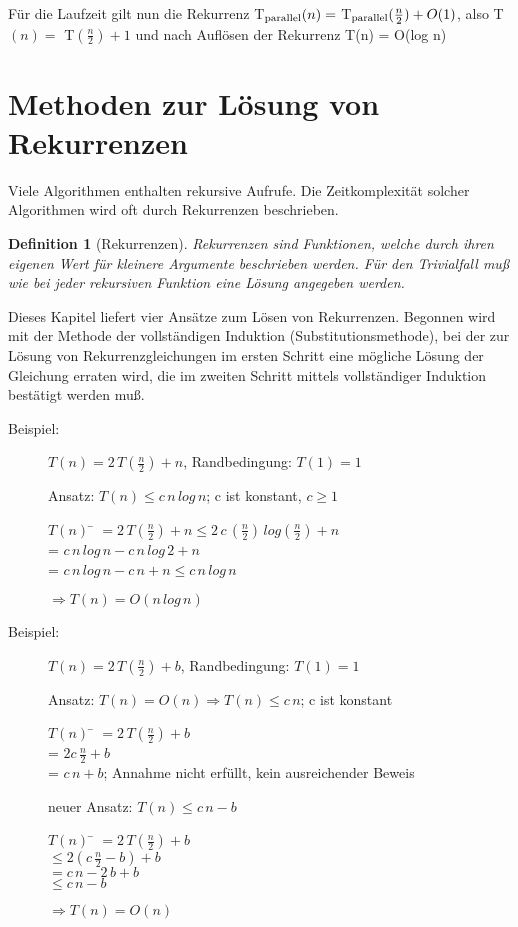 \documentclass[ngerman]{scrreprt}%
\theoremstyle{break}
\newtheorem{definition}{Definition}
\begin{document}
$$  $$

Für die Laufzeit gilt nun die Rekurrenz T$_{\textup{parallel}}(n) =$ T$_{\textup{parallel}}(\frac{n}{2}) + O(1)$,
also T$(n)=$ T$(\frac{n}{2})+1$ und nach Auflösen der Rekurrenz T(n) = O(log n)

\section{Methoden zur Lösung von Rekurrenzen}
Viele Algorithmen enthalten rekursive Aufrufe. Die Zeitkomplexität solcher Algorithmen wird oft durch Rekurrenzen beschrieben.
\begin{definition}[Rekurrenzen]
Rekurrenzen sind Funktionen, welche durch ihren eigenen Wert für kleinere Argumente beschrieben werden. Für den Trivialfall muß wie
bei jeder rekursiven Funktion eine Lösung angegeben werden.
\end{definition}
Dieses Kapitel liefert vier Ansätze zum Lösen von Rekurrenzen.
%
%
Begonnen wird mit der Methode der vollständigen Induktion (Substitutionsmethode),
bei der zur Lösung von Rekurrenzgleichungen im ersten Schritt eine mögliche Lösung der Gleichung erraten wird,
die im zweiten Schritt mittels vollständiger Induktion bestätigt werden muß.		

	\begin{description}
		\item [Beispiel:] $T(n) = 2\,T\left(\frac{n}{2}\right) + n$, Randbedingung: $T(1)=1$

		Ansatz: $T(n) \leq c\,n\,log\,n$; c ist konstant, $c \geq 1$
		\begin{tabbing}
			$T(n)$ \= $= 2\,T\left(\frac{n}{2}\right)+n\leq 2\,c\,\left(\frac{n}{2}\right)\,log\left(\frac{n}{2}\right)+n$\\
			\> = $c\,n\,log\,n-c\,n\,log\,2+n$\\
			\> = $c\,n\,log\,n-c\,n+n \leq c\,n\,log\,n$\\
		\end{tabbing}
		$\Rightarrow T(n)=O(n\,log\,n)$
	\end{description}

	\begin{description}
		\item [Beispiel:] $T(n) = 2\,T\left(\frac{n}{2}\right) + b$, Randbedingung: $T(1)=1$

		Ansatz: $T(n)=O(n)\Rightarrow T(n)\leq c\,n$; c ist konstant
		\begin{tabbing}
			$T(n)$ \= $= 2\,T(\frac{n}{2})+b$\\
			\> = $2c\,\frac{n}{2} +b$\\
			\> = $c\,n+b$; Annahme nicht erfüllt, kein ausreichender Beweis
		\end{tabbing}
		neuer Ansatz: $T(n)\leq c\,n-b$
		\begin{tabbing}
			$T(n)$ \= $=2\,T\left(\frac{n}{2} \right)+b$\\
			\> $\leq 2\left(c\,\frac{n}{2}-b\right)+b$\\
			\> $=c\,n-2\,b+b$\\
			\> $\leq c\,n-b$
		\end{tabbing}
		$\Rightarrow T(n)=O(n)$
	\end{description}
			
\end{document}

